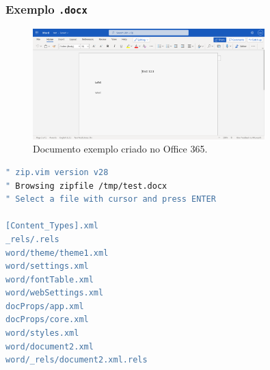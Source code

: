 \begin{frame}
\frametitle{Exemplo \texttt{.docx}}

\begin{figure}[h]
\centering
\includegraphics[width=0.8\textwidth,height=0.8\textheight,keepaspectratio]{figures/test-word.png}
\caption{Documento exemplo criado no Office 365.}
\label{fig-word-test}
\end{figure}

\framebreak

\begin{lstlisting}[language=bash, label=lst-docx, caption={Conteúdo do arquivo \texttt{.docx} exemplo. Visualização com \texttt{vim}.}, postbreak=\mbox{$\hookrightarrow$\space}, basicstyle=\fontsize{6}{8}\selectfont\ttfamily]
" zip.vim version v28
" Browsing zipfile /tmp/test.docx
" Select a file with cursor and press ENTER

[Content_Types].xml
_rels/.rels
word/theme/theme1.xml
word/settings.xml
word/fontTable.xml
word/webSettings.xml
docProps/app.xml
docProps/core.xml
word/styles.xml
word/document2.xml
word/_rels/document2.xml.rels
\end{lstlisting}

\framebreak


\end{frame}
